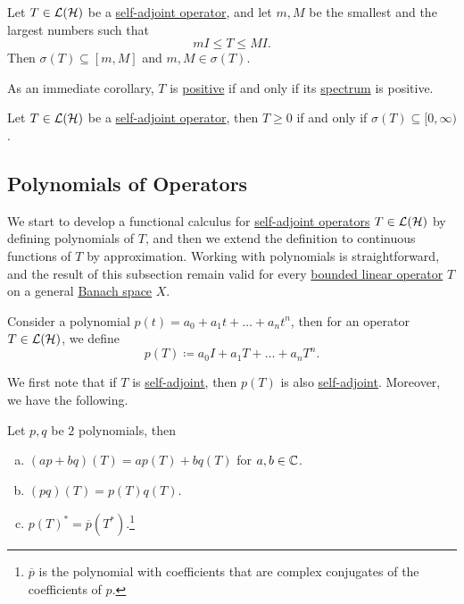 \begin{theorem}\label{thm:spectrum-interval-2}
	Let \(T\in \mathcal{\MakeUppercase{l}} (\mathcal{\MakeUppercase{h}} )\) be a \hyperref[def:self-adjoint-op]{self-adjoint operator}, and let \(m, M\) be the smallest and the largest numbers such that
	\[
		mI \leq T \leq MI.
	\]
	Then \(\sigma (T) \subseteq [m, M]\) and \(m, M\in \sigma (T)\).
\end{theorem}

As an immediate corollary, \(T\) is \hyperref[def:positive-op]{positive} if and only if its \hyperref[def:spectrum-point]{spectrum} is positive.

\begin{corollary}
	Let \(T\in \mathcal{\MakeUppercase{l}} (\mathcal{\MakeUppercase{h}} )\) be a \hyperref[def:self-adjoint-op]{self-adjoint operator}, then \(T \geq 0\) if and only if \(\sigma (T) \subseteq [0, \infty )\).
\end{corollary}

\subsection{Polynomials of Operators}
We start to develop a functional calculus for \hyperref[def:self-adjoint-op]{self-adjoint operators} \(T\in \mathcal{\MakeUppercase{l}} (\mathcal{\MakeUppercase{h}} )\) by defining polynomials of \(T\), and then we extend the definition to continuous functions of \(T\) by approximation. Working with polynomials is straightforward, and the result of this subsection remain valid for every \hyperref[def:bounded-linear-op]{bounded linear operator} \(T\) on a general \hyperref[def:Banach-space]{Banach space} \(X\).

\begin{definition}\label{def:polynomials-of-an-op}
	Consider a polynomial \(p(t) = a_0 + a_1 t + \ldots  + a_n t^n\), then for an operator \(T\in \mathcal{\MakeUppercase{l}} (\mathcal{\MakeUppercase{h}} )\), we define
	\[
		p(T) \coloneqq a_0 I + a_1 T + \ldots  + a_n T^n.
	\]
\end{definition}

We first note that if \(T\) is \hyperref[def:self-adjoint-op]{self-adjoint}, then \(p(T)\) is also \hyperref[def:self-adjoint-op]{self-adjoint}. Moreover, we have the following.

\begin{proposition}
	Let \(p, q\) be \(2\) polynomials, then
	\begin{enumerate}[(a)]
		\item \((ap + bq)(T) = ap(T) + bq(T)\) for \(a, b\in \mathbb{\MakeUppercase{c}} \).
		\item \((pq)(T) = p(T) q(T)\).
		\item \(p(T)^{\ast} = \overline{p} (T^{\ast} )\).\footnote{\(\overline{p} \) is the polynomial with coefficients that are complex conjugates of the coefficients of \(p\).}
	\end{enumerate}
\end{proposition}

